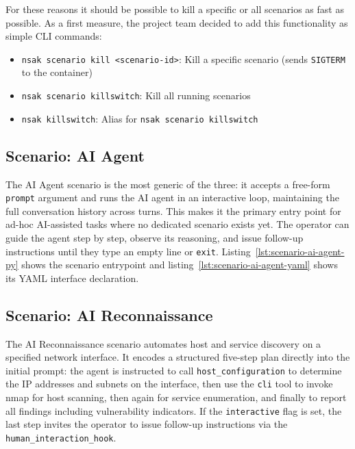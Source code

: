 For these reasons it should be possible to kill a specific or all scenarios as fast as possible.
As a first measure, the project team decided to add this functionality as simple \gls{CLI} commands:

\begin{itemize}
    \item \texttt{nsak scenario kill <scenario-id>}: Kill a specific scenario (sends \texttt{SIGTERM} to the container)
    \item \texttt{nsak scenario killswitch}: Kill all running scenarios
    \item \texttt{nsak killswitch}: Alias for \texttt{nsak scenario killswitch}
\end{itemize}

\subsection{Scenario: AI Agent}\label{subsec:scenario-ai-agent}

The \gls{AI} Agent scenario is the most generic of the three: it accepts a free-form \texttt{prompt} argument
and runs the \gls{AI} agent in an interactive loop, maintaining the full conversation history across turns.
This makes it the primary entry point for ad-hoc \gls{AI}-assisted tasks where no dedicated scenario exists yet.
The operator can guide the agent step by step, observe its reasoning, and issue follow-up instructions until they type an empty line or \texttt{exit}.
Listing~\ref{lst:scenario-ai-agent-py} shows the scenario entrypoint and listing~\ref{lst:scenario-ai-agent-yaml} shows its \gls{YAML} interface declaration.

\subsection{Scenario: AI Reconnaissance}\label{subsec:scenario-ai-reconnaissance}

The \gls{AI} Reconnaissance scenario automates host and service discovery on a specified network interface.
It encodes a structured five-step plan directly into the initial prompt: the agent is instructed to call \texttt{host_configuration} to determine the \gls{IP} addresses and subnets on the interface,
then use the \texttt{cli} tool to invoke nmap for host scanning, then again for service enumeration, and finally to report all findings including vulnerability indicators.
If the \texttt{interactive} flag is set, the last step invites the operator to issue follow-up instructions via the \texttt{human_interaction_hook}.

